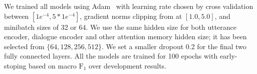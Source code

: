 We trained all models using Adam~\citep{kingma2014adam} with learning
rate chosen by cross validation between $[1e^{-4}, 5*1e^{-4}]$,
gradient norms clipping from at $[1.0, 5.0]$, and minibatch sizes of
32 or 64. We use the same hidden size for both utterance encoder,
dialogue encoder and other attention memory hidden size; it has been
selected from $\{64, 128, 256, 512\}$. We set a smaller dropout 0.2
for the final two fully connected layers. All the models are trained
for 100 epochs with early-stoping based on macro $\text{F}_{1}$ over
development results.




